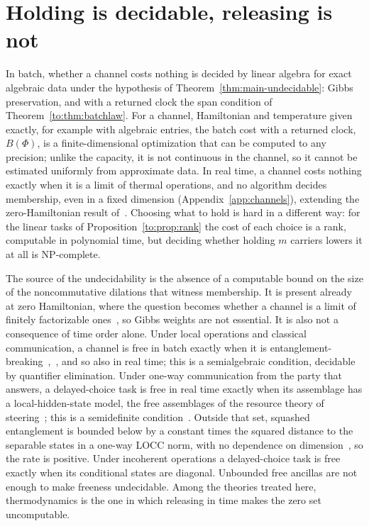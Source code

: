 \section{Holding is decidable, releasing is not}\label{to:sec:computability}

In batch, whether a channel costs nothing is decided by linear algebra for exact algebraic data under the hypothesis of Theorem~\ref{thm:main-undecidable}: Gibbs preservation, and with a returned clock the span condition of Theorem~\ref{to:thm:batchlaw}. For a channel, Hamiltonian and temperature given exactly, for example with algebraic entries, the batch cost with a returned clock, $B(\Phi)$, is a finite-dimensional optimization that can be computed to any precision; unlike the capacity, it is not continuous in the channel, so it cannot be estimated uniformly from approximate data. In real time, a channel costs nothing exactly when it is a limit of thermal operations, and no algorithm decides membership, even in a fixed dimension (Appendix~\ref{app:channels}), extending the zero-Hamiltonian result of~\cite{Flagship}. Choosing what to hold is hard in a different way: for the linear tasks of Proposition~\ref{to:prop:rank} the cost of each choice is a rank, computable in polynomial time, but deciding whether holding $m$ carriers lowers it at all is NP-complete.

The source of the undecidability is the absence of a computable bound on the size of the noncommutative dilations that witness membership. It is present already at zero Hamiltonian, where the question becomes whether a channel is a limit of finitely factorizable ones~\cite{Memory}, so Gibbs weights are not essential. It is also not a consequence of time order alone. Under local operations and classical communication, a channel is free in batch exactly when it is entanglement-breaking~\cite{HSR03},~\cite[Cor.~18]{BBCW13}, and so also in real time; this is a semialgebraic condition, decidable by quantifier elimination. Under one-way communication from the party that answers, a delayed-choice task is free in real time exactly when its assemblage has a local-hidden-state model, the free assemblages of the resource theory of steering~\cite{GallegoAolita15}; this is a semidefinite condition~\cite{CavalcantiSkrzypczyk17}. Outside that set, squashed entanglement is bounded below by a constant times the squared distance to the separable states in a one-way LOCC norm, with no dependence on dimension~\cite{BCY11}, so the rate is positive. Under incoherent operations a delayed-choice task is free exactly when its conditional states are diagonal. Unbounded free ancillas are not enough to make freeness undecidable. Among the theories treated here, thermodynamics is the one in which releasing in time makes the zero set uncomputable.

